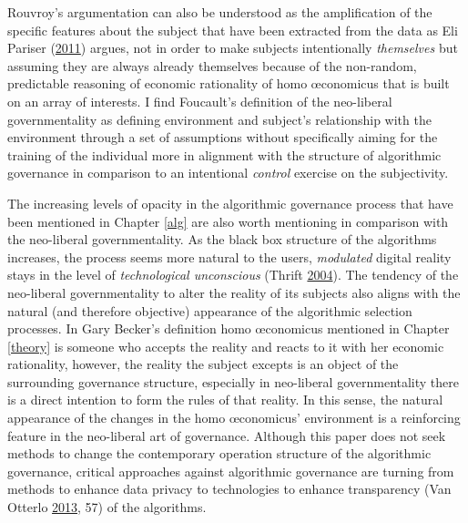 \documentclass[12pt,twoside]{report}
\begin{document}
Rouvroy's argumentation can also be understood as the amplification of the specific features about the subject that have been extracted from the data as Eli Pariser (\protect\hyperlink{ref-Pariser2011}{2011}) argues, not in order to make subjects intentionally \emph{themselves} but assuming they are always already themselves because of the non-random, predictable reasoning of economic rationality of homo œconomicus that is built on an array of interests. I find Foucault's definition of the neo-liberal governmentality as defining environment and subject's relationship with the environment through a set of assumptions without specifically aiming for the training of the individual more in alignment with the structure of algorithmic governance in comparison to an intentional \emph{control} exercise on the subjectivity.

The increasing levels of opacity in the algorithmic governance process that have been mentioned in Chapter \ref{alg} are also worth mentioning in comparison with the neo-liberal governmentality. As the black box structure of the algorithms increases, the process seems more natural to the users, \emph{modulated} digital reality stays in the level of \emph{technological unconscious} (Thrift \protect\hyperlink{ref-Thrift2004}{2004}). The tendency of the neo-liberal governmentality to alter the reality of its subjects also aligns with the natural (and therefore objective) appearance of the algorithmic selection processes. In Gary Becker's definition homo œconomicus mentioned in Chapter \ref{theory} is someone who accepts the reality and reacts to it with her economic rationality, however, the reality the subject excepts is an object of the surrounding governance structure, especially in neo-liberal governmentality there is a direct intention to form the rules of that reality. In this sense, the natural appearance of the changes in the homo œconomicus' environment is a reinforcing feature in the neo-liberal art of governance. Although this paper does not seek methods to change the contemporary operation structure of the algorithmic governance, critical approaches against algorithmic governance are turning from methods to enhance data privacy to technologies to enhance transparency (Van Otterlo \protect\hyperlink{ref-Otterlo2013}{2013}, 57) of the algorithms.
\end{document}

